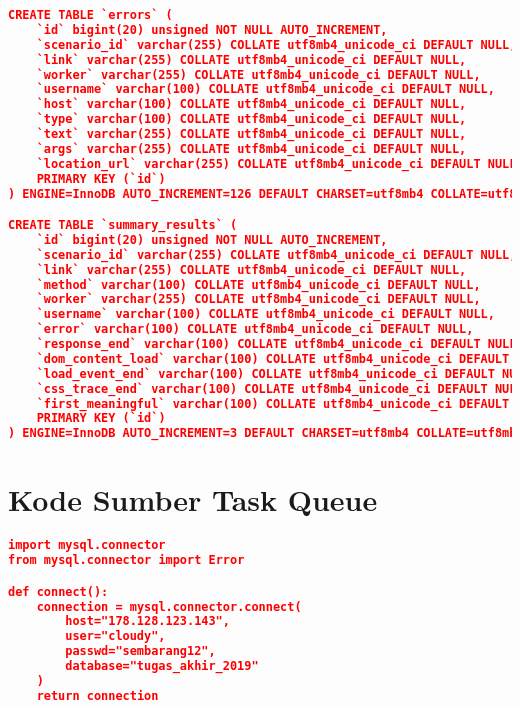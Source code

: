 \begin{lstlisting}[frame=single,tabsize=2,breaklines,caption={Basis data MySQL},label=mysql, captionpos=b, language=json]
CREATE TABLE `errors` (
	`id` bigint(20) unsigned NOT NULL AUTO_INCREMENT,
	`scenario_id` varchar(255) COLLATE utf8mb4_unicode_ci DEFAULT NULL,
	`link` varchar(255) COLLATE utf8mb4_unicode_ci DEFAULT NULL,
	`worker` varchar(255) COLLATE utf8mb4_unicode_ci DEFAULT NULL,
	`username` varchar(100) COLLATE utf8mb4_unicode_ci DEFAULT NULL,
	`host` varchar(100) COLLATE utf8mb4_unicode_ci DEFAULT NULL,
	`type` varchar(100) COLLATE utf8mb4_unicode_ci DEFAULT NULL,
	`text` varchar(255) COLLATE utf8mb4_unicode_ci DEFAULT NULL,
	`args` varchar(255) COLLATE utf8mb4_unicode_ci DEFAULT NULL,
	`location_url` varchar(255) COLLATE utf8mb4_unicode_ci DEFAULT NULL,
	PRIMARY KEY (`id`)
) ENGINE=InnoDB AUTO_INCREMENT=126 DEFAULT CHARSET=utf8mb4 COLLATE=utf8mb4_unicode_ci;

CREATE TABLE `summary_results` (
	`id` bigint(20) unsigned NOT NULL AUTO_INCREMENT,
	`scenario_id` varchar(255) COLLATE utf8mb4_unicode_ci DEFAULT NULL,
	`link` varchar(255) COLLATE utf8mb4_unicode_ci DEFAULT NULL,
	`method` varchar(100) COLLATE utf8mb4_unicode_ci DEFAULT NULL,
	`worker` varchar(255) COLLATE utf8mb4_unicode_ci DEFAULT NULL,
	`username` varchar(100) COLLATE utf8mb4_unicode_ci DEFAULT NULL,
	`error` varchar(100) COLLATE utf8mb4_unicode_ci DEFAULT NULL,
	`response_end` varchar(100) COLLATE utf8mb4_unicode_ci DEFAULT NULL,
	`dom_content_load` varchar(100) COLLATE utf8mb4_unicode_ci DEFAULT NULL,
	`load_event_end` varchar(100) COLLATE utf8mb4_unicode_ci DEFAULT NULL,
	`css_trace_end` varchar(100) COLLATE utf8mb4_unicode_ci DEFAULT NULL,
	`first_meaningful` varchar(100) COLLATE utf8mb4_unicode_ci DEFAULT NULL,
	PRIMARY KEY (`id`)
) ENGINE=InnoDB AUTO_INCREMENT=3 DEFAULT CHARSET=utf8mb4 COLLATE=utf8mb4_unicode_ci;
\end{lstlisting}

\section*{Kode Sumber Task Queue} \label{taskqueue}

\begin{lstlisting}[frame=single,tabsize=2,breaklines,caption={Isi berkas connection.py},label=connectionpy, captionpos=b, language=json]
import mysql.connector
from mysql.connector import Error

def connect():
	connection = mysql.connector.connect(
		host="178.128.123.143",
		user="cloudy",
		passwd="sembarang12",
		database="tugas_akhir_2019"
	)
	return connection
\end{lstlisting}


